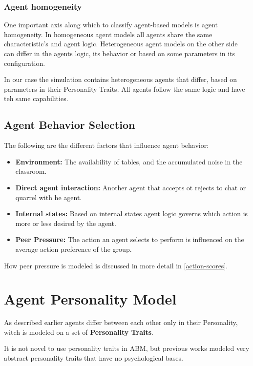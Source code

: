 \subsubsection{Agent homogeneity}
One important axis along which to classify agent-based models is agent homogeneity\cite{Pudane2017}.
In homogeneous agent models all agents share the same characteristic's and agent logic.
Heterogeneous agent models on the other side can differ in the agents logic, its behavior
or based on some parameters in its configuration.

In our case the simulation contains heterogeneous agents that differ, based on parameters
in their Personality Traits. All agents follow the same logic and have teh same
capabilities.

\subsection{Agent Behavior Selection}
The following are the different factors that influence agent behavior:

\begin{itemize}
    \item \textbf{Environment:} The availability of tables, and the accumulated noise in the classroom. 
    \item \textbf{Direct agent interaction:} Another agent that accepts ot rejects to chat or quarrel with he agent.
    \item \textbf{Internal states:} Based on internal states agent logic governs which action is more or less desired by the agent.
    \item \textbf{Peer Pressure:} The action an agent selects to perform is influenced on the average action preference of the group.
\end{itemize}

How peer pressure is modeled is discussed in more detail in \ref{action-scores}.


\pagebreak

\label{BigFive}
\section{Agent Personality Model}
As described earlier agents differ between each other only in their Personality, 
witch is modeled on a set of \textbf{Personality Traits}.

It is not novel to use personality traits in ABM, but previous works\cite{Gautam2009}
modeled very abstract personality traits that have no psychological bases.

